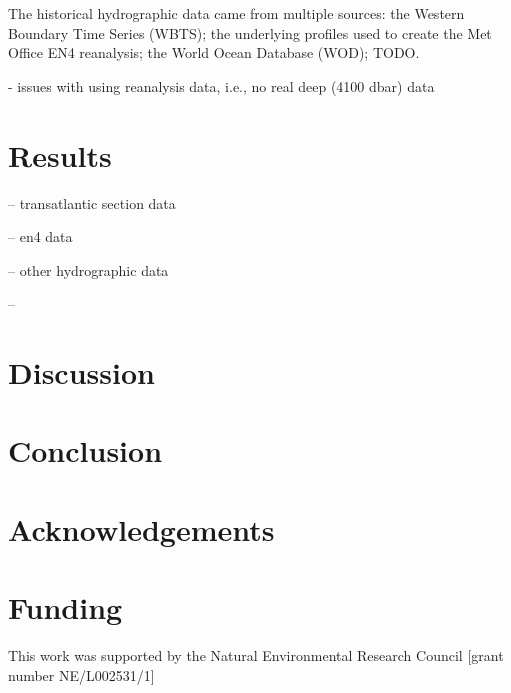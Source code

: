 \documentclass[a4paper,fleqn]{cas-sc}
\begin{document}
The historical hydrographic data came from multiple sources: the Western Boundary Time Series (WBTS); the underlying profiles used to create the Met Office EN4 reanalysis; the World Ocean Database (WOD); TODO.

- issues with using reanalysis data, i.e., no real deep (4100 dbar) data


\section{Results}

-- transatlantic section data

-- en4 data

-- other hydrographic data

-- 

\section{Discussion}

\section{Conclusion}

\section{Acknowledgements}

\section{Funding}

This work was supported by the Natural Environmental Research Council [grant number NE/L002531/1]



 
\end{document}

